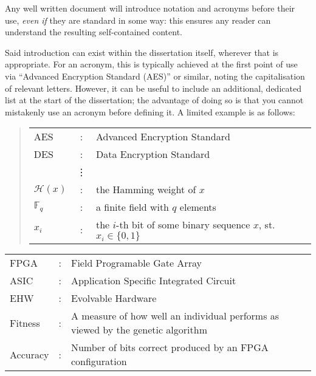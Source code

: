\noindent
{
\color{red}
Any well written document will introduce notation and acronyms before
their use, {\em even if} they are standard in some way: this ensures 
any reader can understand the resulting self-contained content.  

Said introduction can exist within the dissertation itself, wherever 
that is appropriate.  For an acronym, this is typically achieved at 
the first point of use via ``Advanced Encryption Standard (AES)'' or 
similar, noting the capitalisation of relevant letters.  However, it 
can be useful to include an additional, dedicated list at the start 
of the dissertation; the advantage of doing so is that you cannot 
mistakenly use an acronym before defining it.  A limited example is 
as follows:

\begin{quote}
\noindent
\begin{tabular}{lcl}
AES                 &:     & Advanced Encryption Standard                                         \\
DES                 &:     & Data Encryption Standard                                             \\
                    &\vdots&                                                                      \\
${\mathcal H}( x )$ &:     & the Hamming weight of $x$                                            \\
${\mathbb  F}_q$    &:     & a finite field with $q$ elements                                     \\
$x_i$               &:     & the $i$-th bit of some binary sequence $x$, st. $x_i \in \{ 0, 1 \}$ \\
\end{tabular}
\end{quote}
}

\begin{tabular}{lcl}
FPGA &: & Field Programable Gate Array\\
ASIC &: & Application Specific Integrated Circuit\\
EHW &: & Evolvable Hardware\\
Fitness &: & A measure of how well an individual performs as viewed by the genetic algorithm\\
Accuracy &: & Number of bits correct produced by an FPGA configuration
\end{tabular}
